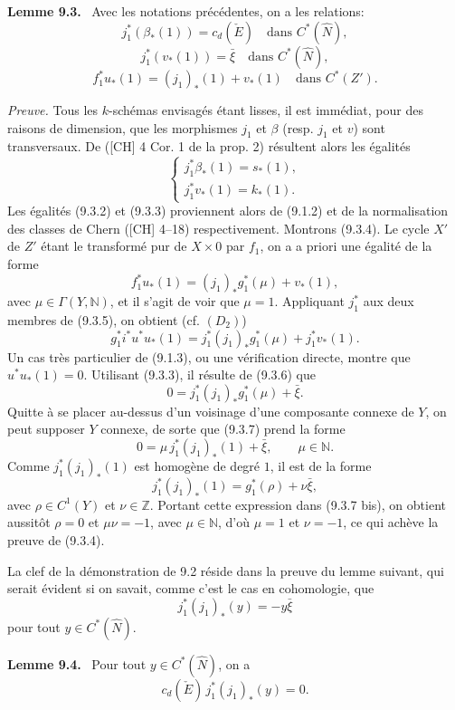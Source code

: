 \documentclass[11pt]{article}
\newenvironment{statement}[1]{\par\medskip\noindent\textbf{#1.}\ }{\par\medskip}
\begin{document}
\begin{statement}{Lemme 9.3}
Avec les notations précédentes, on a les relations:
\[
j_1^*(\beta_*(1))=c_d(\check E)\quad\text{dans }C^*(\widehat N),
\tag{9.3.2}
\]
\[
j_1^*(v_*(1))=\bar\xi\quad\text{dans }C^*(\widehat N),
\tag{9.3.3}
\]
\[
f_1^*u_*(1)=(j_1)_*(1)+v_*(1)\quad\text{dans }C^*(Z').
\tag{9.3.4}
\]
\end{statement}

\emph{Preuve.} Tous les $k$-schémas envisagés étant lisses, il est immédiat, pour des raisons de dimension, que les morphismes $j_1$ et $\beta$ (resp. $j_1$ et $v$) sont transversaux. De ([CH] 4 Cor. 1 de la prop. 2) résultent alors les égalités
\[
\begin{cases}
j_1^*\beta_*(1)=s_*(1),\\
j_1^*v_*(1)=k_*(1).
\end{cases}
\]
Les égalités (9.3.2) et (9.3.3) proviennent alors de (9.1.2) et de la normalisation des classes de Chern ([CH] 4--18) respectivement. Montrons (9.3.4). Le cycle $X'$ de $Z'$ étant le transformé pur de $X\times0$ par $f_1$, on a a priori une égalité de la forme
\[
f_1^*u_*(1)=(j_1)_*g_1^*(\mu)+v_*(1),
\tag{9.3.5}
\]
avec $\mu\in\Gamma(Y,\mathbb N)$, et il s'agit de voir que $\mu=1$. Appliquant $j_1^*$ aux deux membres de (9.3.5), on obtient (cf. $(D_2)$)
\[
g_1^*i^*u^*u_*(1)=j_1^*(j_1)_*g_1^*(\mu)+j_1^*v_*(1).
\tag{9.3.6}
\]
Un cas très particulier de (9.1.3), ou une vérification directe, montre que $u^*u_*(1)=0$. Utilisant (9.3.3), il résulte de (9.3.6) que
\[
0=j_1^*(j_1)_*g_1^*(\mu)+\bar\xi.
\tag{9.3.7}
\]
Quitte à se placer au-dessus d'un voisinage d'une composante connexe de $Y$, on peut supposer $Y$ connexe, de sorte que (9.3.7) prend la forme
\[
0=\mu\,j_1^*(j_1)_*(1)+\bar\xi,\qquad \mu\in\mathbb N.
\tag{9.3.7 bis}
\]
Comme $j_1^*(j_1)_*(1)$ est homogène de degré $1$, il est de la forme
\[
j_1^*(j_1)_*(1)=g_1^*(\rho)+\nu\bar\xi,
\]
avec $\rho\in C^1(Y)$ et $\nu\in\mathbb Z$. Portant cette expression dans (9.3.7 bis), on obtient aussitôt $\rho=0$ et $\mu\nu=-1$, avec $\mu\in\mathbb N$, d'où $\mu=1$ et $\nu=-1$, ce qui achève la preuve de (9.3.4).

La clef de la démonstration de 9.2 réside dans la preuve du lemme suivant, qui serait évident si on savait, comme c'est le cas en cohomologie, que
\[
j_1^*(j_1)_*(y)=-y\bar\xi
\]
pour tout $y\in C^*(\widehat N)$.

\begin{statement}{Lemme 9.4}
Pour tout $y\in C^*(\widehat N)$, on a
\[
c_d(\check E)\,j_1^*(j_1)_*(y)=0.
\]
\end{statement}
\end{document}
